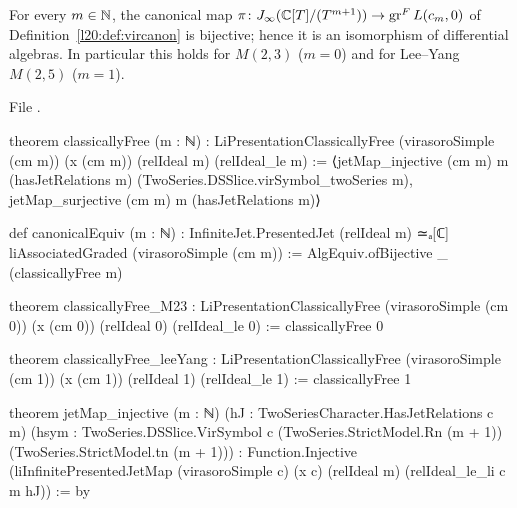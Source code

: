\begin{theorem}\label{l20:thm:virfree}
For every $m\in{\mathbb{N}}$, the canonical map $\pi\colon J_\infty({\mathbb{C}}[T]/(T^{m+1}))\to\operatorname{gr}^F L(c_m,0)$ of
Definition~\ref{l20:def:vircanon} is bijective; hence it is an isomorphism of differential algebras. In particular this holds
for $M(2,3)$ ($m=0$) and for Lee--Yang $M(2,5)$ ($m=1$).
\end{theorem}
\noindent File .
\begin{leancode}
theorem classicallyFree (m : ℕ) :
    LiPresentationClassicallyFree (virasoroSimple (cm m)) (x (cm m)) (relIdeal m)
      (relIdeal_le m) :=
  ⟨jetMap_injective (cm m) m (hasJetRelations m) (TwoSeries.DSSlice.virSymbol_twoSeries m),
    jetMap_surjective (cm m) m (hasJetRelations m)⟩

def canonicalEquiv (m : ℕ) :
    InfiniteJet.PresentedJet (relIdeal m) ≃ₐ[ℂ] liAssociatedGraded (virasoroSimple (cm m)) :=
  AlgEquiv.ofBijective _ (classicallyFree m)

theorem classicallyFree_M23 :
    LiPresentationClassicallyFree (virasoroSimple (cm 0)) (x (cm 0)) (relIdeal 0)
      (relIdeal_le 0) :=
  classicallyFree 0

theorem classicallyFree_leeYang :
    LiPresentationClassicallyFree (virasoroSimple (cm 1)) (x (cm 1)) (relIdeal 1)
      (relIdeal_le 1) :=
  classicallyFree 1

theorem jetMap_injective (m : ℕ) (hJ : TwoSeriesCharacter.HasJetRelations c m)
    (hsym : TwoSeries.DSSlice.VirSymbol c (TwoSeries.StrictModel.Rn (m + 1))
      (TwoSeries.StrictModel.tn (m + 1))) :
    Function.Injective
      (liInfinitePresentedJetMap (virasoroSimple c) (x c) (relIdeal m) (relIdeal_le_li c m hJ)) := by
\end{leancode}

